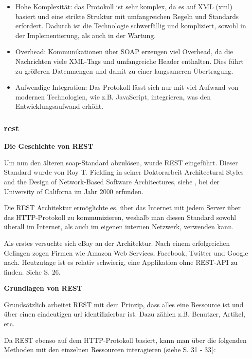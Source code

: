 \begin{itemize}
    \item Hohe Komplexität: das Protokoll ist sehr komplex, da es auf XML (\gls{xml}) basiert und eine strikte Struktur mit umfangreichen Regeln und Standards erfordert. Dadurch ist die Technologie schwerfällig und kompliziert, sowohl in der Implementierung, als auch in der Wartung.
    \item Overhead: Kommunikationen über SOAP erzeugen viel Overhead, da die Nachrichten viele XML-Tags und umfangreiche Header enthalten. Dies führt zu größeren Datenmengen und damit zu einer langsameren Übertragung.
    \item Aufwendige Integration: Das Protokoll lässt sich nur mit viel Aufwand von modernen Technologien, wie z.B. JavaScript, integrieren, was den Entwicklungsaufwand erhöht.
\end{itemize}

\subsubsection{\gls{rest}}

\textbf{Die Geschichte von REST}

Um nun den älteren \gls{soap}-Standard abzulösen, wurde REST eingeführt. Dieser Standard wurde von Roy T. Fielding in seiner Doktorarbeit Architectural Styles and the Design of Network-Based Software Architectures, siehe \cite{doktorarbeit-rest}, bei der University of Californa im Jahr 2000 erfunden. 


Die REST Architektur ermöglichte es, über das Internet mit jedem Server über das HTTP-Protokoll zu kommunizieren, weshalb man diesen Standard sowohl überall im Internet, als auch im eigenen internen Netzwerk, verwenden kann. 


Als erstes versuchte sich eBay an der Architektur. Nach einem erfolgreichen Gelingen zogen Firmen wie Amazon Web Services, Facebook, Twitter und Google nach. Heutzutage ist es relativ schwierig, eine Applikation ohne REST-API zu finden. Siehe \cite{book-modern-api-development-packt} S. 26.
\newline


 \textbf{Grundlagen von REST}

 Grundsätzlich arbeitet REST mit dem Prinzip, dass alles eine Ressource ist und über einen eindeutigen \gls{url} identifizierbar ist. Dazu zählen z.B. Benutzer, Artikel, etc.

 Da REST ebenso auf dem HTTP-Protokoll basiert, kann man über die folgenden Methoden mit den einzelnen Ressourcen interagieren (siehe \cite{book-modern-api-development-packt} S. 31 - 33):

